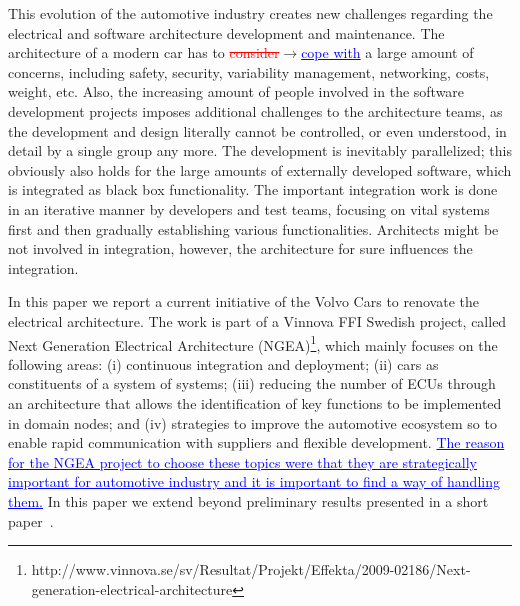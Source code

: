 \documentclass[preprint,12pt,3p]{elsarticle}
\newcommand{\ra}{$\rightarrow$}
\newcommand{\ins}[1]{\textcolor{blue}{\uline{#1}}} %
\newcommand{\chg}[2]{\textcolor{red}{\sout{#1}}{\ra}\textcolor{blue}{\uline{#2}}} %
\newcommand\eric[1]{\nb{Eric}{#1}}
\begin{document}
This evolution of the automotive industry %
creates new challenges regarding the electrical and software
architecture development and maintenance. 
The architecture of a modern car has to \chg{consider}{cope with} a large amount of concerns, including safety, security, variability management, networking, costs, weight, etc.
Also, the increasing amount of people
involved in the software development projects imposes additional challenges to the
architecture teams, as the development and design literally cannot be
controlled, or even understood, in detail by a single group any more. The
development is inevitably parallelized\eric{BE or AE?}; this obviously also holds for the large
amounts of externally developed software, which is integrated as black box
functionality. The important integration work is done in an iterative manner by
developers and test teams, focusing on vital systems first and then gradually
establishing various functionalities. Architects might be not involved in integration, 
however, the architecture for sure influences the integration.

In this paper we report a current initiative of the Volvo Cars to renovate the
electrical architecture. 
The work is part of a Vinnova FFI Swedish project, called Next Generation Electrical Architecture
 (NGEA)\footnote{http://www.vinnova.se/sv/Resultat/Projekt/Effekta/2009-02186/Next-generation-electrical-architecture},
which mainly focuses on the following areas: (i) continuous integration and deployment; (ii)
cars as constituents of a system of systems; (iii) reducing the number of ECUs through an architecture that allows the identification of key functions to be implemented in domain nodes; and (iv) strategies to improve the automotive ecosystem so to enable rapid communication with suppliers and flexible development. \ins{The reason for the NGEA project to choose these topics were that they are strategically important for automotive industry and it is important to find a way of handling them.} In this paper we extend beyond preliminary results presented in a short paper~\cite{WasaPaper}.
 
\end{document}
